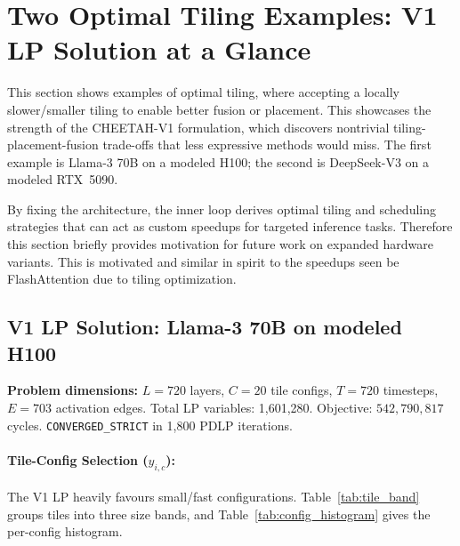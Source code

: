 \section{Two Optimal Tiling Examples: V1 LP Solution at a Glance}
\label{app:tiling}
This section shows examples of optimal tiling, where accepting a locally slower/smaller tiling to enable better fusion or placement.
This showcases the strength of the CHEETAH-V1 formulation, which discovers nontrivial tiling-placement-fusion trade-offs that less expressive methods would miss. The first example is Llama-3 70B on a modeled H100; the second is DeepSeek-V3 on a modeled RTX~5090.

By fixing the architecture, the inner loop derives optimal tiling and scheduling strategies that can act as custom speedups for targeted inference tasks. Therefore this section briefly provides motivation for future work on expanded hardware variants. This is motivated and similar in spirit to the speedups seen be FlashAttention \citep{dao2022flashattention} due to tiling optimization. 


\subsection{V1 LP Solution: Llama-3 70B on modeled H100}

\noindent\textbf{Problem dimensions:}
$L = 720$ layers, $C = 20$ tile configs, $T = 720$ timesteps,
$E = 703$ activation edges.
Total LP variables: 1{,}601{,}280.
Objective: $542{,}790{,}817$ cycles.
\texttt{CONVERGED\_STRICT} in 1{,}800 PDLP iterations.

\paragraph{Tile-Config Selection ($y_{i,c}$):} The V1 LP heavily favours small/fast configurations. Table~\ref{tab:tile_band} groups tiles into three size bands, and Table~\ref{tab:config_histogram} gives the per-config histogram.

